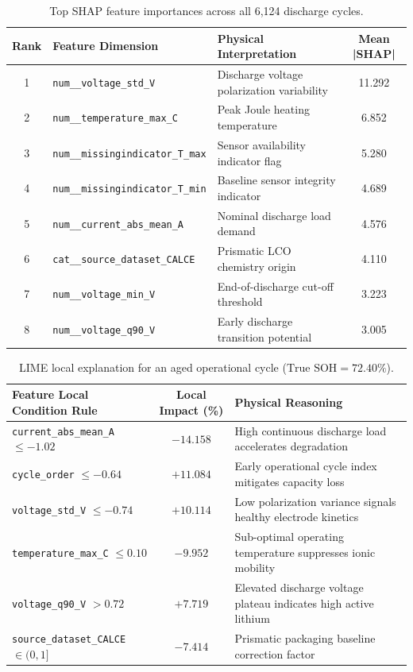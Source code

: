 \documentclass[a4paper,fleqn]{cas-sc}
\begin{document}
\begin{table}[pos=htbp]
\centering
\caption{Top SHAP feature importances across all 6,124 discharge cycles.}
\label{tab:shap_importance}
\small
\renewcommand{\arraystretch}{1.15}
\begin{tabular}{cllc}
\toprule
\textbf{Rank} & \textbf{Feature Dimension} & \textbf{Physical Interpretation} & \textbf{Mean |SHAP|} \\
\midrule
1 & \texttt{num\_\_voltage\_std\_V} & Discharge voltage polarization variability & 11.292 \\
2 & \texttt{num\_\_temperature\_max\_C} & Peak Joule heating temperature & 6.852 \\
3 & \texttt{num\_\_missingindicator\_T\_max} & Sensor availability indicator flag & 5.280 \\
4 & \texttt{num\_\_missingindicator\_T\_min} & Baseline sensor integrity indicator & 4.689 \\
5 & \texttt{num\_\_current\_abs\_mean\_A} & Nominal discharge load demand & 4.576 \\
6 & \texttt{cat\_\_source\_dataset\_CALCE} & Prismatic LCO chemistry origin & 4.110 \\
7 & \texttt{num\_\_voltage\_min\_V} & End-of-discharge cut-off threshold & 3.223 \\
8 & \texttt{num\_\_voltage\_q90\_V} & Early discharge transition potential & 3.005 \\
\bottomrule
\end{tabular}
\end{table}

\begin{table}[pos=htbp]
\centering
\caption{LIME local explanation for an aged operational cycle ($\text{True SOH} = 72.40\%$).}
\label{tab:lime_explanation}
\small
\renewcommand{\arraystretch}{1.15}
\begin{tabular}{p{6.5cm}cp{5.5cm}}
\toprule
\textbf{Feature Local Condition Rule} & \textbf{Local Impact (\%)} & \textbf{Physical Reasoning} \\
\midrule
\texttt{current\_abs\_mean\_A} $\le -1.02$ & $-14.158$ & High continuous discharge load accelerates degradation \\
\texttt{cycle\_order} $\le -0.64$ & $+11.084$ & Early operational cycle index mitigates capacity loss \\
\texttt{voltage\_std\_V} $\le -0.74$ & $+10.114$ & Low polarization variance signals healthy electrode kinetics \\
\texttt{temperature\_max\_C} $\le 0.10$ & $-9.952$ & Sub-optimal operating temperature suppresses ionic mobility \\
\texttt{voltage\_q90\_V} $> 0.72$ & $+7.719$ & Elevated discharge voltage plateau indicates high active lithium \\
\texttt{source\_dataset\_CALCE} $\in (0, 1]$ & $-7.414$ & Prismatic packaging baseline correction factor \\
\bottomrule
\end{tabular}
\end{table}
\end{document}
